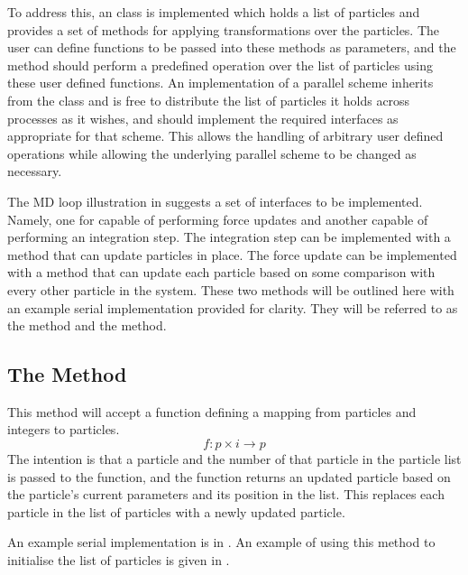 To address this, an \abstractdistribution{} class is implemented
which holds a list of particles and
provides a set of methods for
applying transformations over the particles.
%
The user can define functions to be passed into these methods
as parameters, and the method should perform a predefined operation
over the list of particles using these user defined functions.
%
An implementation of a parallel scheme inherits from the
\abstractdistribution{} class and is free to distribute
the list of particles it holds across processes as it wishes,
and should implement the required interfaces as appropriate for that scheme.
%
This allows the handling of arbitrary user defined operations while
allowing the underlying parallel scheme to be changed as necessary.

%
The MD loop illustration in
suggests a set of interfaces to be implemented.
%
Namely, one for capable of performing force updates and another
capable of performing an integration step.
%
The integration step can be implemented with a method that can update particles
in place.
%
The force update can be implemented with a method that can
update each particle based on some
comparison with every other particle in the system.
%
These two methods will be outlined here with an example serial
implementation provided for clarity.
%
They will be referred to as the \individualoperation{} method and
the \pairoperation{} method.


\subsection{The \individualoperation{} Method}
\label{sec:the_individual_operation_method}

This method will accept a function defining a mapping from
particles and integers to particles.
\begin{equation}
    f: p\times{}i \rightarrow{} p
\end{equation}
%
The intention is that a particle and the number of that particle in
the particle list is passed to the function, and the function
returns an updated particle based on the particle's current parameters
and its position in the list.
%
This replaces each particle in the list of particles with
a newly updated particle.

An example serial implementation is in
.
An example of using this method to initialise the list of
particles is given in
.

